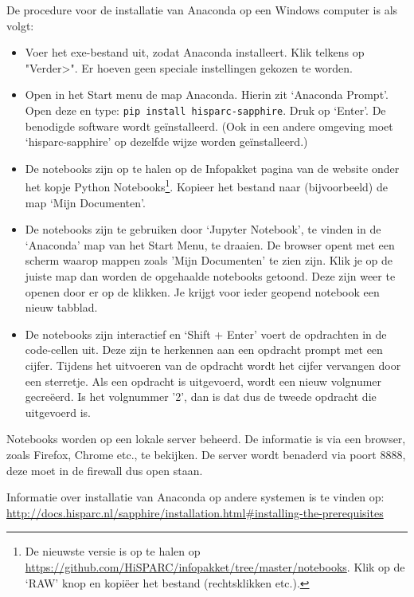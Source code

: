De procedure voor de installatie van Anaconda op een Windows computer is als volgt:

\begin{itemize}
\item Voer het exe-bestand uit, zodat Anaconda installeert. Klik telkens op "Verder>". Er hoeven geen speciale instellingen gekozen te worden.
\item Open in het Start menu de map Anaconda. Hierin zit `Anaconda Prompt'. Open deze en type: {\tt pip install hisparc-sapphire}. Druk op `Enter'. De benodigde \hisparc software wordt geïnstalleerd. (Ook in een andere \python omgeving moet `hisparc-sapphire' op dezelfde wijze worden geïnstalleerd.)
\item De notebooks zijn op te halen op de Infopakket pagina van de \hisparc website onder het kopje Python Notebooks\footnote{De nieuwste versie is op te halen op \url{https://github.com/HiSPARC/infopakket/tree/master/notebooks}. Klik op de `RAW' knop en kopiëer het bestand (rechtsklikken etc.).}. Kopieer het bestand naar (bijvoorbeeld) de map `Mijn Documenten'.
\item De notebooks zijn te gebruiken door `Jupyter Notebook', te vinden in de `Anaconda' map van het Start Menu, te draaien. De browser opent met een scherm waarop mappen zoals 'Mijn Documenten' te zien zijn. Klik je op de juiste map dan worden de opgehaalde notebooks getoond. Deze zijn weer te openen door er op de klikken. Je krijgt voor ieder geopend notebook een nieuw tabblad.
\item De notebooks zijn interactief en `Shift + Enter' voert de opdrachten in de code-cellen uit. Deze zijn te herkennen aan een opdracht prompt met een cijfer. Tijdens het uitvoeren van de opdracht wordt het cijfer vervangen door een sterretje. Als een opdracht is uitgevoerd, wordt een nieuw volgnumer gecreëerd. Is het volgnummer '2', dan is dat dus de tweede opdracht die uitgevoerd is.
\end{itemize}

Notebooks worden op een lokale server beheerd. De informatie is via een browser, zoals Firefox, Chrome etc., te bekijken.
De server wordt benaderd via poort 8888, deze moet in de firewall dus open staan.

Informatie over installatie van Anaconda op andere systemen is te vinden op: \url{http://docs.hisparc.nl/sapphire/installation.html#installing-the-prerequisites}


